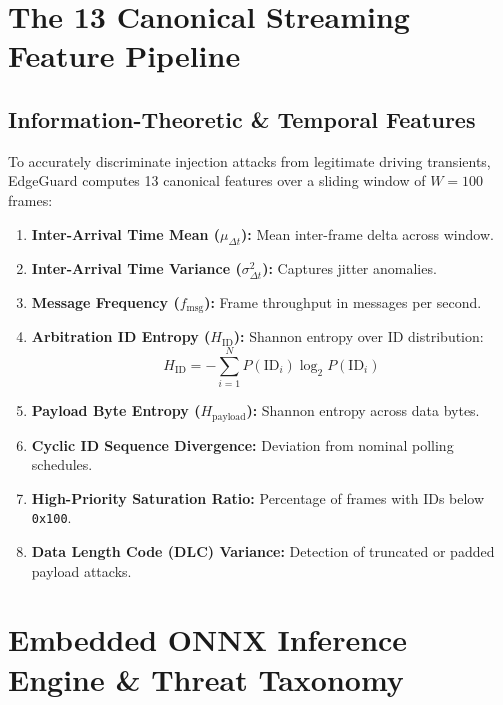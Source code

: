 \documentclass[12pt,a4paper]{report}
\begin{document}
\chapter{The 13 Canonical Streaming Feature Pipeline}

\section{Information-Theoretic \& Temporal Features}
To accurately discriminate injection attacks from legitimate driving transients, EdgeGuard computes 13 canonical features over a sliding window of $W = 100$ frames:
\begin{enumerate}[nosep]
    \item \textbf{Inter-Arrival Time Mean ($\mu_{\Delta t}$):} Mean inter-frame delta across window.
    \item \textbf{Inter-Arrival Time Variance ($\sigma^2_{\Delta t}$):} Captures jitter anomalies.
    \item \textbf{Message Frequency ($f_{\text{msg}}$):} Frame throughput in messages per second.
    \item \textbf{Arbitration ID Entropy ($H_{\text{ID}}$):} Shannon entropy over ID distribution:
    \begin{equation}
    H_{\text{ID}} = - \sum_{i=1}^{N} P(\text{ID}_i) \log_2 P(\text{ID}_i)
    \end{equation}
    \item \textbf{Payload Byte Entropy ($H_{\text{payload}}$):} Shannon entropy across data bytes.
    \item \textbf{Cyclic ID Sequence Divergence:} Deviation from nominal polling schedules.
    \item \textbf{High-Priority Saturation Ratio:} Percentage of frames with IDs below \texttt{0x100}.
    \item \textbf{Data Length Code (DLC) Variance:} Detection of truncated or padded payload attacks.
\end{enumerate}

\chapter{Embedded ONNX Inference Engine \& Threat Taxonomy}
\end{document}

